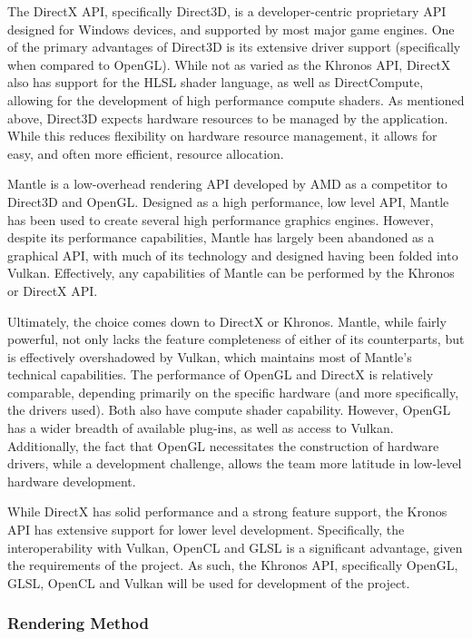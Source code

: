 \documentclass[onecolumn, draftclsnofoot,10pt, compsoc]{IEEEtran}
\newcounter{threesection}[subsubsection]
\newcounter{foursection}[threesection]
\begin{document}
The DirectX API, specifically Direct3D, is a developer-centric proprietary API designed for Windows devices, and supported by most major game engines. One of the primary advantages of Direct3D is its extensive driver support (specifically when compared to OpenGL). While not as varied as the Khronos API, DirectX also has support for the HLSL shader language, as well as DirectCompute, allowing for the development of high performance compute shaders. As mentioned above, Direct3D expects hardware resources to be managed by the application. While this reduces flexibility on hardware resource management, it allows for easy, and often more efficient, resource allocation.

Mantle is a low-overhead rendering API developed by AMD as a competitor to Direct3D and OpenGL. Designed as a high performance, low level API, Mantle has been used to create several high performance graphics engines. However, despite its performance capabilities, Mantle has largely been abandoned as a graphical API, with much of its technology and designed having been folded into Vulkan. Effectively, any capabilities of Mantle can be performed by the Khronos or DirectX API.

Ultimately, the choice comes down to DirectX or Khronos. Mantle, while fairly powerful, not only lacks the feature completeness of either of its counterparts, but is effectively overshadowed by Vulkan, which maintains most of Mantle's technical capabilities. The performance of OpenGL and DirectX is relatively comparable, depending primarily on the specific hardware (and more specifically, the drivers used). Both also have compute shader capability. However, OpenGL has a wider breadth of available plug-ins, as well as access to Vulkan. Additionally, the fact that OpenGL necessitates the construction of hardware drivers, while a development challenge, allows the team more latitude in low-level hardware development.

While DirectX has solid performance and a strong feature support, the Kronos API has extensive support for lower level development. Specifically, the interoperability with Vulkan, OpenCL and GLSL is a significant advantage, given the requirements of the project. As such, the Khronos API, specifically OpenGL, GLSL, OpenCL and Vulkan will be used for development of the project.

\subsubsection{Rendering Method}
\end{document}
